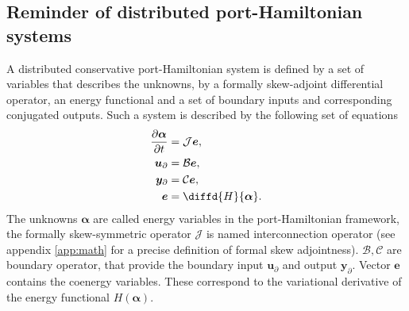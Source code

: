 \subsection{Reminder of distributed port-Hamiltonian systems}

A distributed conservative port-Hamiltonian system is defined by a set of variables that describes the unknowns, by a formally skew-adjoint differential operator, an energy functional and a set of boundary inputs and corresponding conjugated outputs. Such a system is described by the following set of equations
\begin{equation}
\begin{aligned}
\displaystyle \diffp{\bm{\alpha}}{t} &= \mathcal{J}\bm{e}, \vspace{3pt}\\
\bm{u}_\partial &= \mathcal{B} \displaystyle \bm{e}, \vspace{3pt}\\
\bm{y}_\partial &= \mathcal{C} \displaystyle \bm{e}, \vspace{3pt}\\
\bm{e} &= \displaystyle \diffd{H}{\bm{\alpha}}. \\
\end{aligned}
\end{equation}
The unknowns $\bm{\alpha}$ are called energy variables in the port-Hamiltonian framework, the formally skew-symmetric operator $\mathcal{J}$ is named interconnection operator (see appendix \ref{app:math} for a precise definition of formal skew adjointness). $\mathcal{B}, \mathcal{C}$ are boundary operator, that provide the boundary input $\bm{u}_\partial$ and output $\bm{y}_\partial$. Vector $\bm{e}$ contains the coenergy variables. These correspond to the variational derivative of the energy functional  $H(\bm{\alpha})$.

